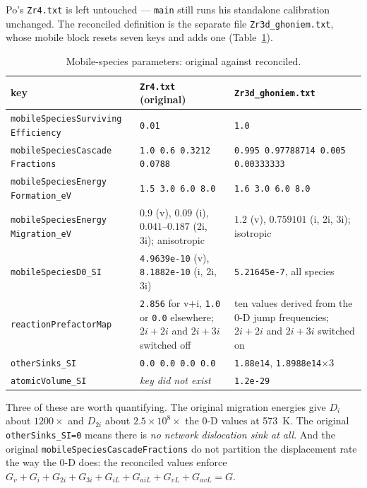 \documentclass[11pt]{article}
\newcommand{\code}[1]{\texttt{\small #1}}
\newcommand{\file}[1]{\texttt{\footnotesize #1}}
\begin{document}
Po's \file{Zr4.txt} is left untouched --- \file{main} still runs his standalone
calibration unchanged. The reconciled definition is the separate file
\file{Zr3d\_ghoniem.txt}, whose mobile block resets seven keys and adds one
(Table~\ref{tab:mobdiff}).

\begin{table}[htbp]
\centering
\caption{Mobile-species parameters: original against reconciled.}
\label{tab:mobdiff}
\begin{tabular}{@{}p{}p{}p{}@{}}
\toprule
key & \file{Zr4.txt} (original) & \file{Zr3d\_ghoniem.txt} \\
\midrule
\code{mobileSpeciesSurviving} \code{Efficiency} & \code{0.01} & \code{1.0} \\
\code{mobileSpeciesCascade} \code{Fractions} &
  \code{1.0 0.6 0.3212 0.0788} &
  \code{0.995 0.97788714 0.005 0.00333333} \\
\code{mobileSpeciesEnergy} \code{Formation\_eV} &
  \code{1.5 3.0 6.0 8.0} & \code{1.6 3.0 6.0 8.0} \\
\code{mobileSpeciesEnergy} \code{Migration\_eV} &
  $0.9$ (v), $0.09$ (i), $0.041$--$0.187$ (2i, 3i); anisotropic &
  $1.2$ (v), $0.759101$ (i, 2i, 3i); isotropic \\
\code{mobileSpeciesD0\_SI} &
  \code{4.9639e-10} (v), \code{8.1882e-10} (i, 2i, 3i) &
  \code{5.21645e-7}, all species \\
\code{reactionPrefactorMap} &
  \code{2.856} for v$+$i, \code{1.0} or \code{0.0} elsewhere; $2i+2i$ and
  $2i+3i$ switched off &
  ten values derived from the 0-D jump frequencies; $2i+2i$ and $2i+3i$
  switched on \\
\code{otherSinks\_SI} & \code{0.0 0.0 0.0 0.0} &
  \code{1.88e14}, \code{1.8988e14}$\times3$ \\
\code{atomicVolume\_SI} & \emph{key did not exist} & \code{1.2e-29} \\
\bottomrule
\end{tabular}
\end{table}

\noindent
Three of these are worth quantifying. The original migration energies give
$D_i$ about $1200\times$ and $D_{2i}$ about $2.5\times10^{8}\times$ the 0-D
values at 573~K. The original \code{otherSinks\_SI=0} means there is
\emph{no network dislocation sink at all}. And the original
\code{mobileSpeciesCascadeFractions} do not partition the displacement rate the
way the 0-D does: the reconciled values enforce
$G_v + G_i + G_{2i} + G_{3i} + G_{iL} + G_{aiL} + G_{vL} + G_{avL} = G$.
\end{document}
